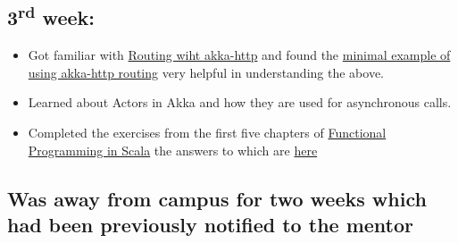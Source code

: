 \documentclass{article}
\begin{document}
    
\subsection*{3\textsuperscript{rd} week:}
\begin{itemize}
 \item Got familiar with \href{http://doc.akka.io/docs/akka-http/current/scala/http/routing-dsl/index.html}{Routing wiht akka-http} and found the 
\href{http://doc.akka.io/docs/akka-http/current/scala/http/routing-dsl/index.html#minimal-example}{minimal example of using akka-http routing} very helpful in understanding the above.

  \item Learned about Actors in Akka and how they are used for asynchronous calls.


 \item Completed the exercises from the first five chapters of \href{https://www.manning.com/books/functional-programming-in-scala}{Functional Programming in Scala} the answers to which are \href{www.google.com}{here} 

\end{itemize}

\subsection*{Was away from campus for two weeks which had been previously notified to the mentor}
\end{document}

